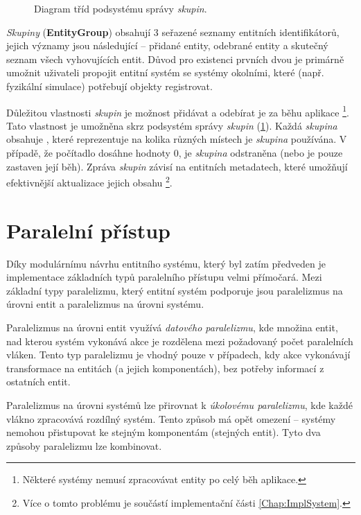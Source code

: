 \begin{figure}[H]
	\centering
	\caption{Diagram tříd podsystému správy \emph{skupin}.}
	\label{Fig:DESGroupDiag}
\end{figure}

\emph{Skupiny} (\textbf{EntityGroup}) obsahují 3 seřazené seznamy entitních identifikátorů, jejich významy jsou následující -- přidané entity, odebrané entity a skutečný seznam všech vyhovujících entit. Důvod pro existenci prvních dvou je primárně umožnit uživateli propojit entitní systém se systémy okolními, které (např. fyzikální simulace) potřebují objekty registrovat.

Důležitou vlastnosti \emph{skupin} je možnost přidávat a odebírat je za běhu aplikace \footnote{Některé systémy nemusí zpracovávat entity po celý běh aplikace.}. Tato vlastnost je umožněna skrz podsystém správy \emph{skupin} (\ref{Fig:DESGroupDiag}). Každá \emph{skupina} obsahuje , které reprezentuje na kolika různých místech je \emph{skupina} používána. V případě, že počítadlo dosáhne hodnoty 0, je \emph{skupina} odstraněna (nebo je pouze zastaven její běh). Zpráva \emph{skupin} závisí na entitních metadatech, které umožňují efektivnější aktualizace jejich obsahu \footnote{Více o tomto problému je součástí implementační části \ref{Chap:ImplSystem}.}.

\section{Paralelní přístup}

Díky modulárnímu návrhu entitního systému, který byl zatím předveden je implementace základních typů paralelního přístupu velmi přímočará. Mezi základní typy paralelizmu, který entitní systém podporuje jsou paralelizmus na úrovni entit a paralelizmus na úrovni systému.

Paralelizmus na úrovni entit využívá \emph{datového paralelizmu}, kde množina entit, nad kterou systém vykonává akce je rozdělena mezi požadovaný počet paralelních vláken. Tento typ paralelizmu je vhodný pouze v případech, kdy akce vykonávají transformace na entitách (a jejich komponentách), bez potřeby informací z ostatních entit. 

Paralelizmus na úrovni systémů lze přirovnat k \emph{úkolovému paralelizmu}, kde každé vlákno zpracovává rozdílný systém. Tento způsob má opět omezení -- systémy nemohou přistupovat ke stejným komponentám (stejných entit). Tyto dva způsoby paralelizmu lze kombinovat.


